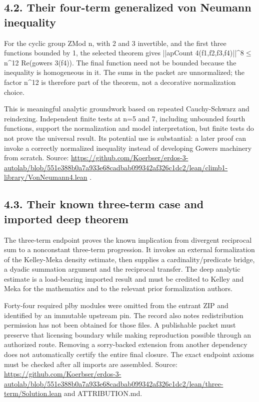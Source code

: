 \documentclass[11pt,a4paper]{article}
\begin{document}
\subsection{4.2. Their four-term generalized von Neumann inequality}
For the cyclic group ZMod n, with 2 and 3 invertible, and the first three functions bounded by 1, the selected theorem gives ||apCount 4(f1,f2,f3,f4)||\textasciicircum{}8\ensuremath{\leq}n\textasciicircum{}12 Re(gowers 3(f4)). The final function need not be bounded because the inequality is homogeneous in it. The sums in the packet are unnormalized; the factor n\textasciicircum{}12 is therefore part of the theorem, not a decorative normalization choice.

This is meaningful analytic groundwork based on repeated Cauchy-Schwarz and reindexing. Independent finite tests at n=5 and 7, including unbounded fourth functions, support the normalization and model interpretation, but finite tests do not prove the universal result. Its potential use is substantial: a later proof can invoke a correctly normalized inequality instead of developing Gowers machinery from scratch. Source: \url{https://github.com/Koerbser/erdos-3-autolab/blob/551e388b0a7a933e68cadbab099342af326c1dc2/lean/climb1-library/VonNeumann4.lean} .

\subsection{4.3. Their known three-term case and imported deep theorem}
The three-term endpoint proves the known implication from divergent reciprocal sum to a nonconstant three-term progression. It invokes an external formalization of the Kelley-Meka density estimate, then supplies a cardinality/predicate bridge, a dyadic summation argument and the reciprocal transfer. The deep analytic estimate is a load-bearing imported result and must be credited to Kelley and Meka for the mathematics and to the relevant prior formalization authors.

Forty-four required plby modules were omitted from the entrant ZIP and identified by an immutable upstream pin. The record also notes redistribution permission has not been obtained for those files. A publishable packet must preserve that licensing boundary while making reproduction possible through an authorized route. Removing a sorry-backed extension from another dependency does not automatically certify the entire final closure. The exact endpoint axioms must be checked after all imports are assembled. Source: \url{https://github.com/Koerbser/erdos-3-autolab/blob/551e388b0a7a933e68cadbab099342af326c1dc2/lean/three-term/Solution.lean} and ATTRIBUTION.md.
\end{document}
